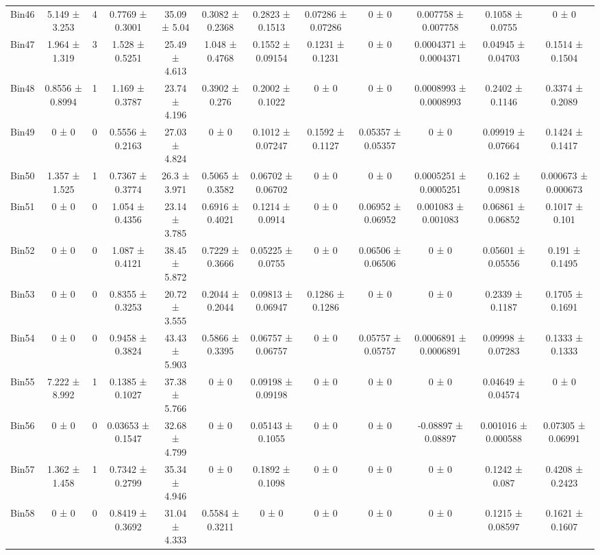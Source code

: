 \begin{tabular}{@{\extracolsep{4pt}}lccccccccccc@{}}
     Bin46 & 5.149 ± 3.253 & 4 & 0.7769 ± 0.3001 & 35.09 ± 5.04 & 0.3082 ± 0.2368 & 0.2823 ± 0.1513 & 0.07286 ± 0.07286 & 0 ± 0 & 0.007758 ± 0.007758 & 0.1058 ± 0.0755 & 0 ± 0 \\ 
     Bin47 & 1.964 ± 1.319 & 3 & 1.528 ± 0.5251 & 25.49 ± 4.613 & 1.048 ± 0.4768 & 0.1552 ± 0.09154 & 0.1231 ± 0.1231 & 0 ± 0 & 0.0004371 ± 0.0004371 & 0.04945 ± 0.04703 & 0.1514 ± 0.1504 \\ 
     Bin48 & 0.8556 ± 0.8994 & 1 & 1.169 ± 0.3787 & 23.74 ± 4.196 & 0.3902 ± 0.276 & 0.2002 ± 0.1022 & 0 ± 0 & 0 ± 0 & 0.0008993 ± 0.0008993 & 0.2402 ± 0.1146 & 0.3374 ± 0.2089 \\ 
     Bin49 & 0 ± 0 & 0 & 0.5556 ± 0.2163 & 27.03 ± 4.824 & 0 ± 0 & 0.1012 ± 0.07247 & 0.1592 ± 0.1127 & 0.05357 ± 0.05357 & 0 ± 0 & 0.09919 ± 0.07664 & 0.1424 ± 0.1417 \\ 
     Bin50 & 1.357 ± 1.525 & 1 & 0.7367 ± 0.3774 & 26.3 ± 3.971 & 0.5065 ± 0.3582 & 0.06702 ± 0.06702 & 0 ± 0 & 0 ± 0 & 0.0005251 ± 0.0005251 & 0.162 ± 0.09818 & 0.000673 ± 0.000673 \\ 
     Bin51 & 0 ± 0 & 0 & 1.054 ± 0.4356 & 23.14 ± 3.785 & 0.6916 ± 0.4021 & 0.1214 ± 0.0914 & 0 ± 0 & 0.06952 ± 0.06952 & 0.001083 ± 0.001083 & 0.06861 ± 0.06852 & 0.1017 ± 0.101 \\ 
     Bin52 & 0 ± 0 & 0 & 1.087 ± 0.4121 & 38.45 ± 5.872 & 0.7229 ± 0.3666 & 0.05225 ± 0.0755 & 0 ± 0 & 0.06506 ± 0.06506 & 0 ± 0 & 0.05601 ± 0.05556 & 0.191 ± 0.1495 \\ 
     Bin53 & 0 ± 0 & 0 & 0.8355 ± 0.3253 & 20.72 ± 3.555 & 0.2044 ± 0.2044 & 0.09813 ± 0.06947 & 0.1286 ± 0.1286 & 0 ± 0 & 0 ± 0 & 0.2339 ± 0.1187 & 0.1705 ± 0.1691 \\ 
     Bin54 & 0 ± 0 & 0 & 0.9458 ± 0.3824 & 43.43 ± 5.903 & 0.5866 ± 0.3395 & 0.06757 ± 0.06757 & 0 ± 0 & 0.05757 ± 0.05757 & 0.0006891 ± 0.0006891 & 0.09998 ± 0.07283 & 0.1333 ± 0.1333 \\ 
     Bin55 & 7.222 ± 8.992 & 1 & 0.1385 ± 0.1027 & 37.38 ± 5.766 & 0 ± 0 & 0.09198 ± 0.09198 & 0 ± 0 & 0 ± 0 & 0 ± 0 & 0.04649 ± 0.04574 & 0 ± 0 \\ 
     Bin56 & 0 ± 0 & 0 & 0.03653 ± 0.1547 & 32.68 ± 4.799 & 0 ± 0 & 0.05143 ± 0.1055 & 0 ± 0 & 0 ± 0 & -0.08897 ± 0.08897 & 0.001016 ± 0.000588 & 0.07305 ± 0.06991 \\ 
     Bin57 & 1.362 ± 1.458 & 1 & 0.7342 ± 0.2799 & 35.34 ± 4.946 & 0 ± 0 & 0.1892 ± 0.1098 & 0 ± 0 & 0 ± 0 & 0 ± 0 & 0.1242 ± 0.087 & 0.4208 ± 0.2423 \\ 
     Bin58 & 0 ± 0 & 0 & 0.8419 ± 0.3692 & 31.04 ± 4.333 & 0.5584 ± 0.3211 & 0 ± 0 & 0 ± 0 & 0 ± 0 & 0 ± 0 & 0.1215 ± 0.08597 & 0.1621 ± 0.1607 \\ 

\end{tabular}
